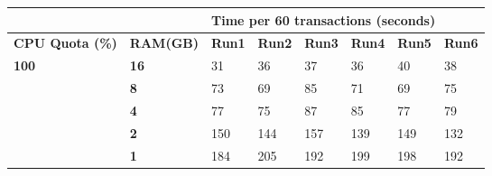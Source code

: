 \documentclass[english]{tktltiki}
\begin{document}
\begin{table}[H]
\centering
\begin{tabular}{llllllll}
\hline
\multicolumn{1}{|l|}{}                        & \multicolumn{1}{l|}{}             & \multicolumn{6}{l|}{\textbf{Time per 60 transactions (seconds)}}                                                                                                                                                            \\ \hline
\multicolumn{1}{|l|}{\textbf{CPU Quota (\%)}} & \multicolumn{1}{l|}{\textbf{RAM(GB)}} & \multicolumn{1}{l|}{\textbf{Run1}} & \multicolumn{1}{l|}{\textbf{Run2}} & \multicolumn{1}{l|}{\textbf{Run3}} & \multicolumn{1}{l|}{\textbf{Run4}} & \multicolumn{1}{l|}{\textbf{Run5}} & \multicolumn{1}{l|}{\textbf{Run6}} \\ \hline
\multicolumn{1}{|l|}{\textbf{100}}            & \multicolumn{1}{l|}{\textbf{16}}  & \multicolumn{1}{l|}{31}            & \multicolumn{1}{l|}{36}            & \multicolumn{1}{l|}{37}            & \multicolumn{1}{l|}{36}            & \multicolumn{1}{l|}{40}            & \multicolumn{1}{l|}{38}            \\ \hline
\multicolumn{1}{|l|}{\textbf{}}               & \multicolumn{1}{l|}{\textbf{8}}   & \multicolumn{1}{l|}{73}            & \multicolumn{1}{l|}{69}            & \multicolumn{1}{l|}{85}            & \multicolumn{1}{l|}{71}            & \multicolumn{1}{l|}{69}            & \multicolumn{1}{l|}{75}            \\ \hline
\multicolumn{1}{|l|}{\textbf{}}               & \multicolumn{1}{l|}{\textbf{4}}   & \multicolumn{1}{l|}{77}            & \multicolumn{1}{l|}{75}            & \multicolumn{1}{l|}{87}            & \multicolumn{1}{l|}{85}            & \multicolumn{1}{l|}{77}            & \multicolumn{1}{l|}{79}            \\ \hline
\multicolumn{1}{|l|}{\textbf{}}               & \multicolumn{1}{l|}{\textbf{2}}   & \multicolumn{1}{l|}{150}           & \multicolumn{1}{l|}{144}           & \multicolumn{1}{l|}{157}           & \multicolumn{1}{l|}{139}           & \multicolumn{1}{l|}{149}           & \multicolumn{1}{l|}{132}           \\ \hline
\multicolumn{1}{|l|}{\textbf{}}               & \multicolumn{1}{l|}{\textbf{1}}   & \multicolumn{1}{l|}{184}           & \multicolumn{1}{l|}{205}           & \multicolumn{1}{l|}{192}           & \multicolumn{1}{l|}{199}           & \multicolumn{1}{l|}{198}           & \multicolumn{1}{l|}{192}           \\ \hline

\end{tabular}
\end{table}
\end{document}
